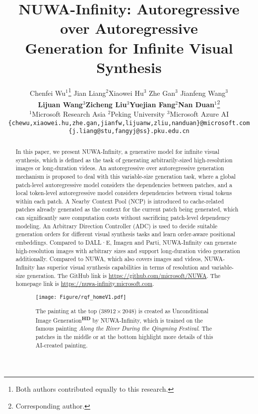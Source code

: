 \documentclass{article}
\title{NUWA-Infinity: Autoregressive over Autoregressive\\ Generation for Infinite Visual Synthesis}
\author{Chenfei Wu$^{1}$\thanks{Both authors contributed equally to this research.} \quad Jian Liang$^{2}$\samethanks[1] \quad Xiaowei Hu$^{3}$ \quad  Zhe Gan$^{3}$ \quad Jianfeng Wang$^{3}$\\ \textbf{Lijuan Wang}$^{3}$\quad  \textbf{Zicheng Liu}$^{3}$\quad  \textbf{Yuejian Fang}$^{2}$\quad \textbf{Nan Duan}$^{1}$\thanks{Corresponding author.} \\
 {$^{1}$Microsoft Research Asia \quad $^{2}$Peking University
 \quad $^{3}$Microsoft Azure AI} \\
{\tt\small\{chewu,xiaowei.hu,zhe.gan,jianfw,lijuanw,zliu,nanduan\}@microsoft.com}\\ {\tt\small\{j.liang@stu,fangyj@ss\}.pku.edu.cn}}
\begin{document}
\maketitle
\vspace{-9mm}

\begin{abstract}
\vspace{-4mm}
In this paper, we present NUWA-Infinity, a generative model for infinite visual synthesis, which is defined as the task of generating arbitrarily-sized high-resolution images or long-duration videos. An autoregressive over autoregressive generation mechanism is proposed to deal with this variable-size generation task, where a global patch-level autoregressive model considers the dependencies between patches, and a local token-level autoregressive model considers dependencies between visual tokens within each patch. A Nearby Context Pool (NCP) is introduced to cache-related patches already generated as the context for the current patch being generated, which can significantly save computation costs without sacrificing patch-level dependency modeling. An Arbitrary Direction Controller (ADC) is used to decide suitable generation orders for different visual synthesis tasks and learn order-aware positional embeddings. Compared to DALL·E, Imagen and Parti, NUWA-Infinity can generate high-resolution images with arbitrary sizes and support long-duration video generation additionally. Compared to NUWA, which also covers images and videos, NUWA-Infinity has superior visual synthesis capabilities in terms of resolution and variable-size generation. The GitHub link is \url{https://github.com/microsoft/NUWA}. The homepage link is \url{https://nuwa-infinity.microsoft.com}.

 






\begin{figure}[htbp]
\vspace{-3mm}
    \centering
    \texttt{[image: Figure/rqf\_homeV1.pdf]}
    \caption{The painting at the top ($38912\times2048$) is created as Unconditional Image Generation\textsuperscript{\textbf{HD}} by NUWA-Infinity, which is trained on the famous painting \textit{Along the River During the Qingming Festival}. The patches in the middle or at the bottom highlight more details of this AI-created painting.}
    \label{fig:qm}
\end{figure}






\end{abstract}
\end{document}
